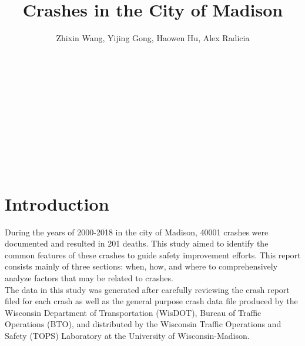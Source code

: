 \documentclass[15pt]{article}
\author{Zhixin Wang, Yijing Gong, Haowen Hu, Alex Radicia}
\title{Crashes in the City of Madison}
\date{}
\begin{document}
\maketitle

~\\
~\\
~\\
~\\
~\\
~\\
~\\
~\\
\section{Introduction}
During the years of 2000-2018 in the city of Madison, 40001 crashes were documented and resulted in 201 deaths. This study aimed to identify the common features of these crashes to guide safety improvement efforts. This report consists mainly of three sections: when, how, and where to comprehensively analyze factors that may be related to crashes.           
~\\
\newline
The data in this study was generated after carefully reviewing the crash report filed for each crash as well as the general purpose crash data file produced by the Wisconsin Department of Transportation (WisDOT), Bureau of Traffic Operations (BTO), and distributed by the Wisconsin Traffic Operations and Safety (TOPS) Laboratory at the University of Wisconsin-Madison.    

\newpage
\end{document}
